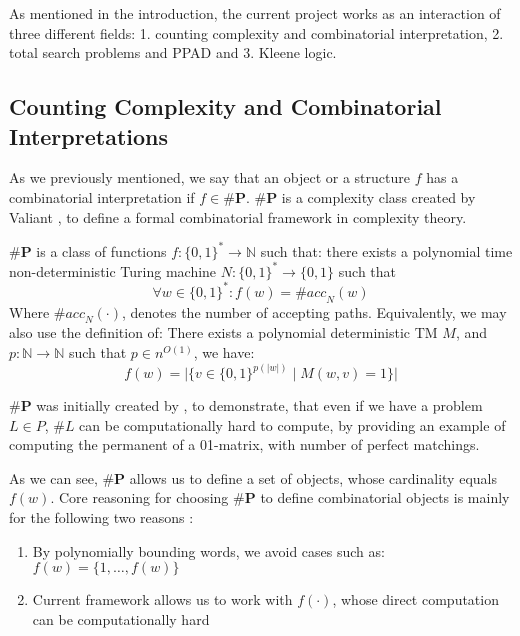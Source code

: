 

As mentioned in the introduction, the current project works as an interaction
of three different fields: 1. counting complexity and combinatorial interpretation, 
2. total search problems and PPAD and 3. Kleene logic.


\subsection{Counting Complexity and Combinatorial Interpretations}
As we previously mentioned, we say that an object or a structure $f$
has a combinatorial interpretation if $f \in \textbf{\#P}$. $\textbf{\#P}$
is a complexity class created by Valiant \cite{valiantComplexityComputingPermanent1979},
to define a formal combinatorial framework in complexity theory.


\begin{definition}
    $\textbf{\#P}$ is a class of functions $f: \{0,1\}^* \to \mathbb{N}$
    such that: there exists a polynomial time non-deterministic
    Turing machine $N: \{0,1\}^* \to \{0,1\}$ such that
    $$
    \forall w \in \{0,1\}^*: f(w) = \textit{\#acc}_N(w)
    $$
    Where $\textit{\#acc}_N(\cdot)$, denotes the number of accepting paths.
    Equivalently, we may also use the definition of: There
    exists a polynomial deterministic TM $M$, and
    $p : \mathbb{N} \to \mathbb{N}$ such that $p \in n^{O(1)}$, we have:
    $$
    f(w) = \Big|\Big\{v \in \{0,1\}^{p(|w|)} \mid M(w, v) =1 \Big\}\Big|
    $$
\end{definition}

$\textbf{\#P}$ was initially created by \cite{valiantComplexityComputingPermanent1979},
to demonstrate, that even if we have a problem $L \in P$, $\#L$ can be computationally
hard to compute, by providing an example of computing the permanent of
a 01-matrix, with number of perfect matchings. 

As we can see, $\textbf{\#P}$ allows us to define a set of objects,
whose cardinality equals $f(w)$. Core reasoning for choosing
$\textbf{\#P}$ to define combinatorial objects is mainly for the 
following two reasons \cite{ikenmeyerPositivitySymmetricGroup2024}: 

\begin{enumerate}
    \item By polynomially bounding words, we avoid cases such as: $f(w) = \{1, \hdots, f(w)\}$
    \item Current framework allows us to work with $f(\cdot)$, whose direct computation can be computationally hard
\end{enumerate}


